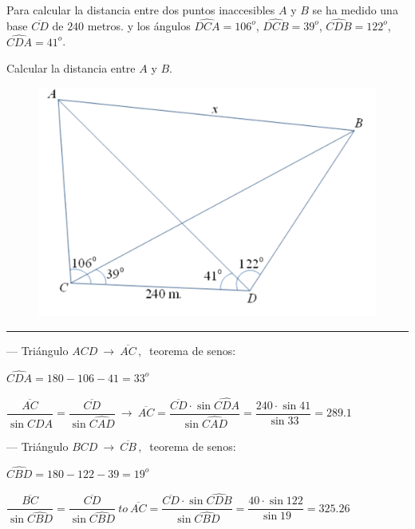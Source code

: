 \begin{miejercicio}

\begin{multicols}{2}

Para calcular la distancia entre dos puntos inaccesibles $A$ y $B$ se ha medido una base $\overline{CD}$ de $240$ metros. y los ángulos $\widehat {DCA}=106^o$, $\widehat{DCB}=39^o$, $\widehat{CDB}=122^o$, $\widehat{CDA}=41^o$.

\vspace{2mm} Calcular la distancia entre $A$ y $B$.
 
	\begin{figure}[H]
	\centering
	\includegraphics[width=.45\textwidth]{img-triang/triang21.png}
\end{figure}
\end{multicols}
\vspace{-8mm}

\rule{250pt}{0.1pt}

\vspace{2mm} --- Triángulo $ACD \ \to \ \overline{AC}\, , \  $ teorema de senos:

\vspace{2mm} $\widehat{CDA}=180-106-41=33^o$

\vspace{2mm} $\dfrac{\overline{AC}}{\sin \widehat{CDA}}=\dfrac{\overline{CD}}{\sin \widehat{CAD}} \ \to \ 
\overline{AC}= \dfrac{\overline{CD}\cdot \sin \widehat{CDA}}{\sin \widehat{CAD}}=\dfrac{240\cdot \sin 41}{\sin 33}=289.1$



\vspace{6mm} --- Triángulo $BCD \ \to \ \overline{CB}\, , \  $ teorema de senos:

\vspace{2mm} $\widehat{CBD}=180-122-39=19^o$

\vspace{2mm} $\dfrac{\overline{BC}}{\sin \widehat{CBD}}=\dfrac{\overline{CD}}{\sin \widehat{CBD}} \ to \ \overline{AC}=\dfrac{\overline{CD}\cdot \sin \widehat{CDB}}{\sin \widehat{CBD}}= \dfrac{40\cdot \sin 122}{\sin 19}=325.26 $


\end{miejercicio}
